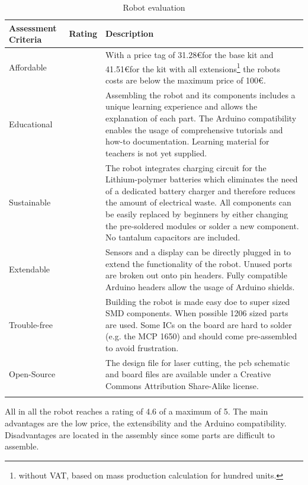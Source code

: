\begin{longtabu} to \textwidth { X[1,l] X[1,l] X[4,l]}
\toprule
Assessment Criteria    & Rating & Description \\
\midrule
Affordable      &     & With a price tag of 31.28\euro for the base kit and 41.51\euro for the kit with all extensions\footnote{without VAT, based on mass production calculation for hundred units.} the robots costs are below the maximum price of 100\euro.\\
Educational     &      & Assembling the robot and its components includes a unique learning experience and allows the explanation of each part. The Arduino compatibility enables the usage of comprehensive tutorials and how-to documentation. Learning material for teachers is not yet supplied. \\
Sustainable       &      &  The robot integrates charging circuit for the Lithium-polymer batteries which eliminates the need of a dedicated battery charger and therefore reduces the amount of electrical waste. All components can be easily replaced by beginners by either changing the pre-soldered modules or solder a new component. No tantalum capacitors are included.\\
Extendable &       &  Sensors and a display can be directly plugged in to extend the functionality of the robot. Unused ports are broken out onto pin headers. Fully compatible Arduino headers allow the usage of Arduino shields.\\
Trouble-free &  & Building the robot is made easy doe to super sized SMD components. When possible 1206 sized parts are used. Some ICs on the board are hard to solder (e.g. the MCP 1650) and should come pre-assembled to avoid frustration.\\
Open-Source &  & The design file for laser cutting, the pcb schematic and board files are available under a Creative Commons Attribution Share-Alike license.\\
\bottomrule
\caption{Robot evaluation}
\label{tbl:arduinorobot_eval}
\end{longtabu}

All in all the robot reaches a rating of 4.6 of a maximum of 5. The main advantages are the low price, the extensibility and the Arduino compatibility. Disadvantages are located in the assembly since some parts are difficult to assemble.


